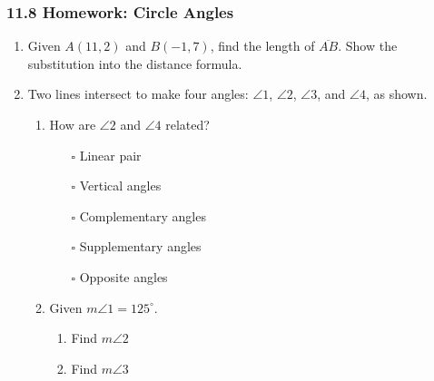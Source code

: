 

\fancyhead[LE]{\thepage}



\subsubsection*{11.8 Homework: Circle Angles}
\begin{enumerate}
\item Given $A(11,2)$ and $B(-1,7)$, find the length of $\overline{AB}$. Show the substitution into the distance formula.

\item Two lines intersect to make four angles: $\angle 1$, $\angle 2$, $\angle 3$, and $\angle 4$, as shown.
  \begin{multicols}{2}  
    \begin{enumerate}
      \item How are $\angle 2$ and $\angle 4$ related?
        \begin{itemize}
          \item[$\square$] Linear pair
          \item[$\square$] Vertical angles
          \item[$\square$] Complementary angles
          \item[$\square$] Supplementary angles
          \item[$\square$] Opposite angles
        \end{itemize}
      \item Given $m\angle 1 = 125^\circ$.
        \begin{enumerate}
          \item Find $m\angle 2$ \vspace{0.5cm}
          \item Find $m\angle 3$ \vspace{2cm}
        \end{enumerate} 
        \end{enumerate}
  \end{multicols}
  

\end{enumerate}
